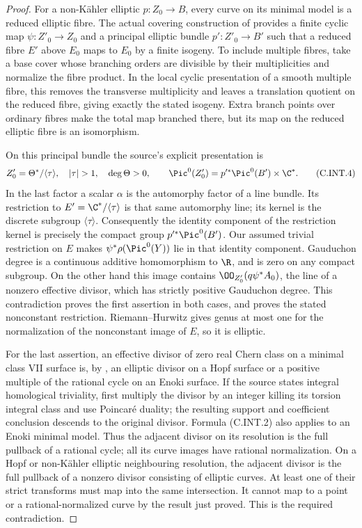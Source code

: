 \begin{proof}
For a non-K\"ahler elliptic $p:Z_0\to B$, every curve
on its minimal model is a reduced elliptic fibre.
The actual covering construction of
\cite[Lemma~2.2 and \S2]{BrinzanescuMoraru2005}
provides a finite cyclic map $\psi:Z'_0\to Z_0$ and a
principal elliptic bundle $p':Z'_0\to B'$ such that a
reduced fibre $E'$ above $E_0$ maps to $E_0$ by a finite
isogeny. To include multiple fibres, take a base cover
whose branching orders are divisible by their
multiplicities and normalize the fibre product. In the
local cyclic presentation of a smooth multiple fibre,
this removes the transverse multiplicity and leaves a
translation quotient on the reduced fibre, giving exactly
the stated isogeny. Extra branch points over ordinary
fibres make the total map branched there, but its map on
the reduced elliptic fibre is an isomorphism.

On this principal bundle the source's explicit
presentation is
\[
 Z'_0=\Theta^*/\langle\tau\rangle,
 \quad |\tau|>1,\quad \deg\Theta>0,
 \qquad
 \Pic^0(Z'_0)=p'^*\Pic^0(B')\times\C^*.
 \tag{C.INT.4}
\]
In the last factor a scalar $\alpha$ is the automorphy
factor of a line bundle. Its restriction to
$E'=\C^*/\langle\tau\rangle$ is that same automorphy
line; its kernel is the discrete subgroup
$\langle\tau\rangle$. Consequently the identity
component of the restriction kernel is precisely the
compact group $p'^*\Pic^0(B')$.
Our assumed trivial restriction on $E$ makes
$\psi^*\rho(\Pic^0(Y))$ lie in that identity component.
Gauduchon degree is a continuous additive homomorphism
to $\R$, and is zero on any compact subgroup. On the
other hand this image contains
$\OO_{Z'_0}(q\psi^*A_0)$, the line of a nonzero effective
divisor, which has strictly positive Gauduchon degree.
This contradiction proves the first assertion in both
cases, and proves the stated nonconstant restriction.
Riemann--Hurwitz gives genus at most one for the
normalization of the nonconstant image of $E$, so it is
elliptic.

For the last assertion, an effective divisor of zero
real Chern class on a minimal class VII surface is,
by \cite[Remark~2.7]{DlousskyTeleman2012}, an elliptic
divisor on a Hopf surface or a positive multiple of the
rational cycle on an Enoki surface. If the source states
integral homological triviality, first multiply the
divisor by an integer killing its torsion integral
class and use Poincar\'e duality; the resulting support
and coefficient conclusion descends to the original
divisor. Formula (C.INT.2) also applies to an Enoki
minimal model. Thus the adjacent divisor on its
resolution is the full pullback of a rational cycle;
all its curve images have rational normalization.
On a Hopf or non-K\"ahler elliptic neighbouring
resolution, the adjacent divisor is the full pullback
of a nonzero divisor consisting of elliptic curves.
At least one of their strict transforms must map
into the same intersection. It cannot map to a point
or a rational-normalized curve by the result just
proved. This is the required contradiction.
\end{proof}

